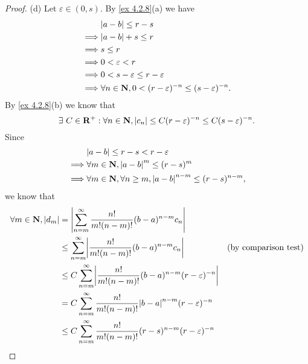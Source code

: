\begin{proof}{(d)}
  Let \(\varepsilon \in (0, s)\).
  By \cref{ex 4.2.8}(a) we have
  \begin{align*}
             & \abs{a - b} \leq r - s                                                    \\
    \implies & \abs{a - b} + s \leq r                                                    \\
    \implies & s \leq r                                                                  \\
    \implies & 0 < \varepsilon < r                                                       \\
    \implies & 0 < s - \varepsilon \leq r - \varepsilon                                  \\
    \implies & \forall n \in \N, 0 < (r - \varepsilon)^{-n} \leq (s - \varepsilon)^{-n}.
  \end{align*}
  By \cref{ex 4.2.8}(b) we know that
  \[
    \exists\ C \in \mathbf{R}^+ : \forall n \in \mathbf{N}, \left\lvert c_n\right\rvert \leq C (r - \varepsilon)^{-n} \leq C (s - \varepsilon)^{-n}.
  \]
  Since
  \begin{align*}
             & \abs{a - b} \leq r - s < r - \varepsilon                                      \\
    \implies & \forall m \in \N, \abs{a - b}^{m} \leq (r - s)^m                              \\
    \implies & \forall m \in \N, \forall n \geq m, \abs{a - b}^{n - m} \leq (r - s)^{n - m},
  \end{align*}
  we know that
  \begin{align*}
    \forall m \in \N, \abs{d_m} & = \abs{\sum_{n = m}^\infty \frac{n!}{m! (n - m)!} (b - a)^{n - m} c_n}                                                       \\
                                & \leq \sum_{n = m}^\infty \abs{\frac{n!}{m! (n - m)!} (b - a)^{n - m} c_n}                      & \text{(by comparison test)} \\
                                & \leq C \sum_{n = m}^\infty \abs{\frac{n!}{m! (n - m)!} (b - a)^{n - m} (r - \varepsilon)^{-n}}                               \\
                                & = C \sum_{n = m}^\infty \frac{n!}{m! (n - m)!} \abs{b - a}^{n - m} (r - \varepsilon)^{-n}                                    \\
                                & \leq C \sum_{n = m}^\infty \frac{n!}{m! (n - m)!} (r - s)^{n - m} (r - \varepsilon)^{-n}                                     \\

\end{align*}
\end{proof}
